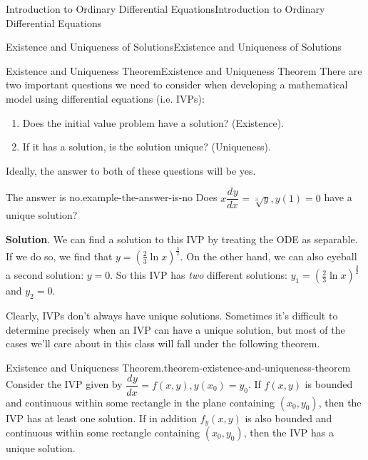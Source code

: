 \documentclass[10pt,]{book}
\numberwithin{equation}{section}
\newcommand{\dv}[3][]{\dfrac{d^{#1} #2}{d #3^{#1}}}
\begin{document}
\begin{chapterptx}{Introduction to Ordinary Differential Equations}{}{Introduction to Ordinary Differential Equations}{}{}
\begin{sectionptx}{Existence and Uniqueness of Solutions}{}{Existence and Uniqueness of Solutions}{}{}
\begin{introduction}{}
\end{introduction}%
%
%
\typeout{************************************************}
\typeout{************************************************}
%
\begin{subsectionptx}{Existence and Uniqueness Theorem}{}{Existence and Uniqueness Theorem}{}{}\label{subsection-existence-and-uniqueness-theorem}
\hypertarget{p-92}{}%
There are two important questions we need to consider when developing a mathematical model using differential equations (i.e. IVPs): \leavevmode%
\begin{enumerate}
\item\hypertarget{li-9}{}Does the initial value problem have a solution? (Existence).%
\item\hypertarget{li-10}{}If it has a solution, is the solution unique? (Uniqueness).%
\end{enumerate}
 Ideally, the answer to both of these questions will be yes.%
\begin{example}{The answer is no.}{example-the-answer-is-no}%
\hypertarget{p-93}{}%
Does \(x\dv{y}{x} = \sqrt[3]{y},y(1) = 0\) have a unique solution?%
\par\smallskip%
\noindent\textbf{Solution}.\hypertarget{solution-16}{}\quad%
\hypertarget{p-94}{}%
We can find a solution to this IVP by treating the ODE as separable. If we do so, we find that \(y = \left(\frac{2}{3}\ln x\right)^{\frac{3}{2}}\). On the other hand, we can also eyeball a second solution: \(y=0\). So this IVP has \emph{two} different solutions: \(y_{1} = \left(\frac{2}{3}\ln x\right)^{\frac{3}{2}}\) and \(y_{2} = 0\).%
\end{example}
\hypertarget{p-95}{}%
Clearly, IVPs don't always have unique solutions. Sometimes it's difficult to determine precisely when an IVP can have a unique solution, but most of the cases we'll care about in this class will fall under the following theorem.%
\begin{theorem}{Existence and Uniqueness Theorem.}{}{theorem-existence-and-uniqueness-theorem}%
\hypertarget{p-96}{}%
Consider the IVP given by \(\dv{y}{x} = f(x,y), y(x_{0}) = y_{0}\). If \(f(x,y)\) is bounded and continuous within some rectangle in the plane containing \((x_{0},y_{0})\), then the IVP has at least one solution. If in addition \(f_{y}(x,y)\) is also bounded and continuous within some rectangle containing \((x_{0},y_{0})\), then the IVP has a unique solution.%
\end{theorem}

\end{subsectionptx}
\end{sectionptx}
\end{chapterptx}
\end{document}
